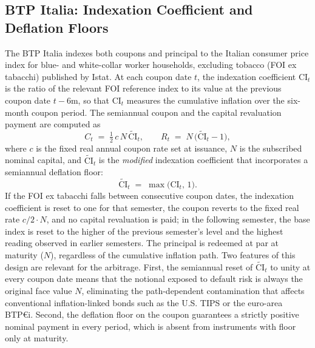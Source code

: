 
\subsection{BTP Italia: Indexation Coefficient and Deflation Floors}
\label{app:btp_floor}

The BTP Italia indexes both coupons and principal to the Italian
consumer price index for blue- and white-collar worker households,
excluding tobacco (FOI ex tabacchi) published by Istat. At each coupon date $t$, the
indexation coefficient $\mathrm{CI}_{t}$ is the ratio of the relevant
FOI reference index to its value at the previous coupon date
$t-6\text{m}$, so that $\mathrm{CI}_{t}$ measures the cumulative
inflation over the six-month coupon period. The semiannual coupon and
the capital revaluation payment are computed as
\begin{equation}
C_{t} \;=\; \tfrac{1}{2}\, c\, N \,\widetilde{\mathrm{CI}}_{t},
\qquad
R_{t} \;=\; N\,\bigl(\widetilde{\mathrm{CI}}_{t}-1\bigr),
\label{eq:btp_italia_payments}
\end{equation}
where $c$ is the fixed real annual coupon rate set at issuance, $N$ is
the subscribed nominal capital, and $\widetilde{\mathrm{CI}}_{t}$ is
the \emph{modified} indexation coefficient that incorporates a
semiannual deflation floor:
\begin{equation}
\widetilde{\mathrm{CI}}_{t} \;=\; \max\!\bigl(\mathrm{CI}_{t},\, 1\bigr).
\label{eq:btp_italia_floor}
\end{equation}
If the FOI ex tabacchi falls between consecutive coupon dates, the
indexation coefficient is reset to one for that semester, the coupon
reverts to the fixed real rate $c/2 \cdot N$, and no capital
revaluation is paid; in the following semester, the base index is reset
to the higher of the previous semester's level and the highest reading
observed in earlier semesters. The principal is redeemed at par at
maturity ($N$), regardless of the cumulative inflation path. Two
features of this design are relevant for the arbitrage. First, the
semiannual reset of $\widetilde{\mathrm{CI}}_{t}$ to unity at every
coupon date means that the notional exposed to default risk is always
the original face value $N$, eliminating the path-dependent contamination
that affects conventional inflation-linked bonds such as the U.S. TIPS
or the euro-area BTP\euro i. Second, the deflation floor on the coupon
guarantees a strictly positive nominal payment in every period, which
is absent from instruments with floor only at maturity.


